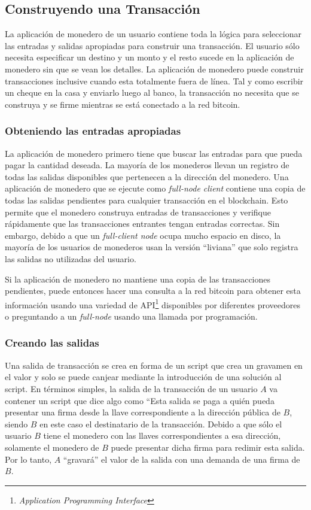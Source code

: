\documentclass[10pt,journal,compsoc]{IEEEtran}
\begin{document}
\subsection{Construyendo una Transacción}
La aplicación de monedero de un usuario contiene toda la lógica para seleccionar las entradas y salidas apropiadas para construir una transacción. El usuario sólo necesita especificar un destino y un monto y el resto sucede en la aplicación de monedero sin que se vean los detalles. La aplicación de monedero puede construir transacciones inclusive cuando esta totalmente fuera de línea. Tal y como escribir un cheque en la casa y enviarlo luego al banco, la transacción no necesita que se construya y se firme mientras se está conectado a la red bitcoin.

\subsubsection{Obteniendo las entradas apropiadas}
La aplicación de monedero primero tiene que buscar las entradas para que pueda pagar la cantidad deseada. La mayoría de los monederos llevan un registro de todas las salidas disponibles que pertenecen a la dirección del monedero. Una aplicación de monedero que se ejecute como \emph{full-node client} contiene una copia de todas las salidas pendientes para cualquier transacción en el blockchain. Esto permite que el monedero construya entradas de transacciones y verifique rápidamente que las transacciones entrantes tengan entradas correctas. Sin embargo, debido a que un \emph{full-client node} ocupa mucho espacio en disco, la mayoría de los usuarios de monederos usan la versión ``liviana'' que solo registra las salidas no utilizadas del usuario.

Si la aplicación de monedero no mantiene una copia de las transacciones pendientes, puede entonces hacer una consulta a la red bitcoin para obtener esta información usando una variedad de API\footnote{\emph{Application Programming Interface}} disponibles por diferentes proveedores o preguntando a un \emph{full-node} usando una llamada por programación.

\subsubsection{Creando las salidas}
Una salida de transacción se crea en forma de un script que crea un gravamen en el valor y solo se puede canjear mediante la introducción de una solución al script. En términos simples, la salida de la transacción de un usuario $A$ va contener un script que dice algo como ``Esta salida se paga a quién pueda presentar una firma desde la llave correspondiente a la dirección pública de $B$, siendo $B$ en este caso el destinatario de la transacción. Debido a que sólo el usuario $B$ tiene el monedero con las llaves correspondientes a esa dirección, solamente el monedero de $B$ puede presentar dicha firma para redimir esta salida. Por lo tanto, $A$ ``gravará'' el valor de la salida con una demanda de una firma de $B$.
\end{document}
